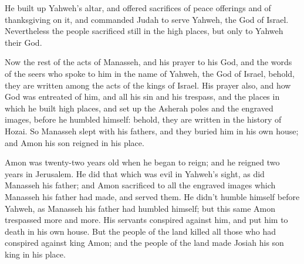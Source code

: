 {He built up Yahweh’s altar, and offered sacrifices of peace offerings and of thanksgiving on it, and commanded Judah to serve Yahweh, the God of Israel.
Nevertheless the people sacrificed still in the high places, but only to Yahweh their God.
\par }{\PP {}Now the rest of the acts of Manasseh, and his prayer to his God, and the words of the seers who spoke to him in the name of Yahweh, the God of Israel, behold, they are written among the acts of the kings of Israel.
His prayer also, and how God was entreated of him, and all his sin and his trespass, and the places in which he built high places, and set up the Asherah poles and the engraved images, before he humbled himself: behold, they are written in the history of Hozai.
So Manasseh slept with his fathers, and they buried him in his own house; and Amon his son reigned in his place.
\par }{\PP {}Amon was twenty-two years old when he began to reign; and he reigned two years in Jerusalem.
He did that which was evil in Yahweh’s sight, as did Manasseh his father; and Amon sacrificed to all the engraved images which Manasseh his father had made, and served them.
He didn’t humble himself before Yahweh, as Manasseh his father had humbled himself; but this same Amon trespassed more and more.
His servants conspired against him, and put him to death in his own house.
But the people of the land killed all those who had conspired against king Amon; and the people of the land made Josiah his son king in his place.

}
